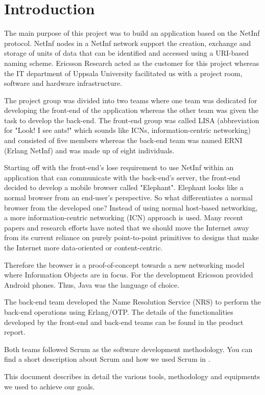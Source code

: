 \section{Introduction}
The main purpose of this project was to build an application based on the NetInf protocol. NetInf nodes in a NetInf network support the creation, exchange and storage of units of data that can be identified and accessed using a URI-based naming scheme. \cite{netinfspecs} Ericsson Research acted as the customer for this project whereas the IT department of Uppsala University facilitated us with a project room, software and hardware infrastructure. 

The project group was divided into two teams where one team was dedicated for developing the front-end of the 
application whereas the other team was given the task to develop the back-end. The front-end group was called 
LISA (abbreviation for "Look! I see ants!" which sounds like ICNs, information-centric networking) and consisted of five members whereas 
the back-end team was named ERNI (Erlang NetInf) and was made up of eight individuals. 

Starting off with the front-end's lose requirement to use NetInf within an application that can communicate with
the back-end's server, the front-end decided to develop a mobile browser called "Elephant". Elephant looks like a normal browser from an end-user's perspective. So what differentiates a normal browser from the developed one? Instead of using normal host-based networking, a more information-centric networking (ICN) approach is used. Many recent papers and research efforts have noted that we should move the Internet away from its current reliance on purely point-to-point primitives to designs that make the Internet more data-oriented or content-centric. \cite{ghodsietal}  

Therefore the browser is a proof-of-concept towards a new networking model where Information Objects are in focus.
For the development Ericsson provided Android phones. Thus, Java was the language of choice.

The back-end team developed the Name Resolution Service (NRS) to perform the back-end operations using Erlang/OTP. The details of the functionalities developed 
by the front-end and back-end teams can be found in the product report. 

Both teams followed Scrum as the software development methodology. You can find a short description about Scrum and
how we used Scrum in .

This document describes in detail the various tools, methodology and equipments we used to achieve our goals. 
